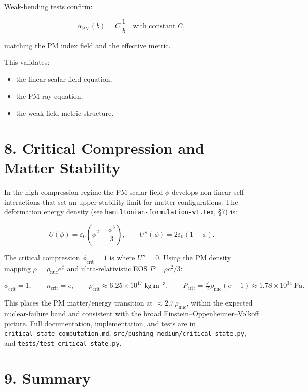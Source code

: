 \documentclass{article}
\begin{document}
Weak-bending tests confirm:



\[
\alpha_{\mathrm{PM}}(b)
=
C\,\frac{1}{b}
\quad\text{with constant } C,
\]



matching the PM index field and the effective metric.

This validates:

\begin{itemize}
    \item the linear scalar field equation,
    \item the PM ray equation,
    \item the weak-field metric structure.
\end{itemize}

\section*{8. Critical Compression and Matter Stability}

In the high-compression regime the PM scalar field $\phi$ develops
non-linear self-interactions that set an upper stability limit for matter
configurations.  The deformation energy density (see
\texttt{hamiltonian-formulation-v1.tex}, \S7) is:


\[
U(\phi) = \varepsilon_0\!\left(\phi^2 - \frac{\phi^3}{3}\right),
\qquad
U''(\phi) = 2\varepsilon_0(1-\phi).
\]


The critical compression $\phi_{\mathrm{crit}} = 1$ is where $U'' = 0$.  Using
the PM density mapping $\rho = \rho_{\mathrm{nuc}}e^\phi$ and ultra-relativistic
EOS $P = \rho c^2/3$:


\[
\phi_{\mathrm{crit}} = 1,
\qquad
n_{\mathrm{crit}} = e,
\qquad
\rho_{\mathrm{crit}} \approx 6.25\times10^{17}\;\mathrm{kg\,m^{-3}},
\qquad
P_{\mathrm{crit}} = \tfrac{c^2}{2}\rho_{\mathrm{nuc}}(e-1) \approx 1.78\times10^{34}\;\mathrm{Pa}.
\]


This places the PM matter/energy transition at $\approx 2.7\,\rho_{\mathrm{nuc}}$,
within the expected nuclear-failure band and consistent with the broad
Einstein--Oppenheimer--Volkoff picture.  Full documentation, implementation,
and tests are in \texttt{critical\_state\_computation.md},
\texttt{src/pushing\_medium/critical\_state.py}, and
\texttt{tests/test\_critical\_state.py}.

\section*{9. Summary}
\end{document}
